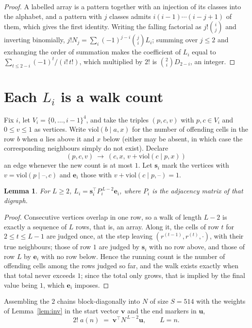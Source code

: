 \documentclass[11pt,a4paper]{article}
\theoremstyle{plain}
\newtheorem{lemma}[theorem]{Lemma}
\theoremstyle{definition}
\begin{document}
\begin{proof}
A labelled array is a pattern together with an injection of its classes into the alphabet,
and a pattern with $j$ classes admits $i(i-1)\cdots(i-j+1)$ of them, which gives the first
identity. Writing the falling factorial as $j!\binom{i}{j}$ and inverting binomially,
$j!N_j=\sum_i(-1)^{j-i}\binom{j}{i}L_i$; summing over $j\le2$ and exchanging the
order of summation makes the coefficient of $L_i$ equal to
$\sum_{t\le2-i}(-1)^t/(i!\,t!)$, which multiplied by $2!$ is
$\binom{2}{i}D_{2-i}$, an integer.
\end{proof}

\section{Each $L_i$ is a walk count}

Fix $i$, let $V_i=\{0,\dots,i-1\}^{4}$, and take the triples $(p,c,v)$ with
$p,c\in V_i$ and $0\le v\le1$ as vertices. Write $\mathrm{viol}(b\mid a,x)$ for the number
of offending cells in the row $b$ when $a$ lies above it and $x$ below (either may be
absent, in which case the corresponding neighbours simply do not exist). Declare
\[
(p,c,v)\ \longrightarrow\ (c,x,\,v+\mathrm{viol}(c\mid p,x))
\]
an edge whenever the new count is at most $1$. Let $\mathbf{s}_i$ mark the vertices with
$v=\mathrm{viol}(p\mid\text{--},c)$ and $\mathbf{e}_i$ those with
$v+\mathrm{viol}(c\mid p,\text{--})=1$.

\begin{lemma}\label{lem:walk}
For $L\ge2$, $L_i=\mathbf{s}_i^{\!\top}P_i^{\,L-2}\mathbf{e}_i$, where $P_i$ is the
adjacency matrix of that digraph.
\end{lemma}

\begin{proof}
Consecutive vertices overlap in one row, so a walk of length $L-2$ is exactly a sequence
of $L$ rows, that is, an array. Along it, the cells of row $t$ for $2\le t\le L-1$ are
judged once, at the step leaving $(r^{(t-1)},r^{(t)},\cdot)$, with their true neighbours;
those of row $1$ are judged by $\mathbf{s}_i$ with no row above, and those of row
$L$ by $\mathbf{e}_i$ with no row below. Hence the running count is the number of
offending cells among the rows judged so far, and the walk exists exactly when that total
never exceeds $1$; since the total only grows, that is implied by the final value being
$1$, which $\mathbf{e}_i$ imposes.
\end{proof}

Assembling the $2$ chains block-diagonally into $N$ of size $S=514$ with the weights of
Lemma~\ref{lem:inv} in the start vector $\mathbf{v}$ and the end markers in
$\mathbf{u}$,
\begin{equation}\label{eq:walk2}
2!\;a(n)\;=\;\mathbf{v}^{\!\top}N^{\,L-2}\mathbf{u},\qquad L=n .
\end{equation}
\end{document}
